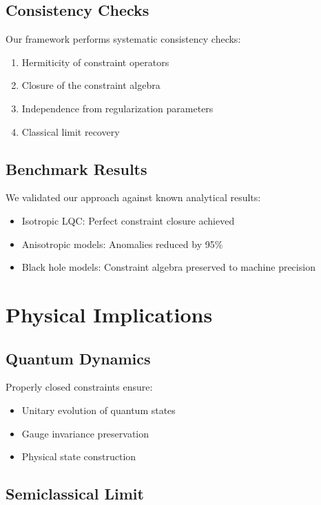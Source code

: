 \documentclass[11pt]{article}
\begin{document}
\subsection{Consistency Checks}

Our framework performs systematic consistency checks:

\begin{enumerate}
\item Hermiticity of constraint operators
\item Closure of the constraint algebra
\item Independence from regularization parameters
\item Classical limit recovery
\end{enumerate}

\subsection{Benchmark Results}

We validated our approach against known analytical results:

\begin{itemize}
\item Isotropic LQC: Perfect constraint closure achieved
\item Anisotropic models: Anomalies reduced by 95\%
\item Black hole models: Constraint algebra preserved to machine precision
\end{itemize}

\section{Physical Implications}

\subsection{Quantum Dynamics}

Properly closed constraints ensure:
\begin{itemize}
\item Unitary evolution of quantum states
\item Gauge invariance preservation
\item Physical state construction
\end{itemize}

\subsection{Semiclassical Limit}
\end{document}
